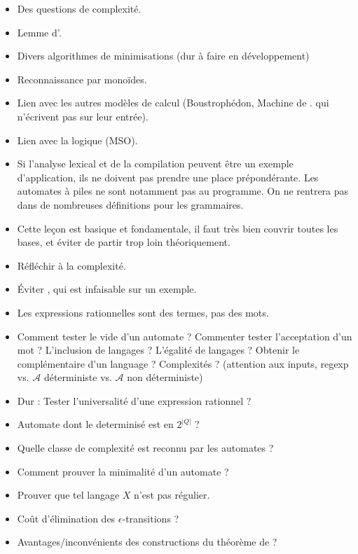 \documentclass{agregfiche}
\begin{document}
\secidees
\begin{itemize}
	\item Des questions de complexité.
    \item Lemme d'.
	\item Divers algorithmes de minimisations (dur à faire en développement)
	\item Reconnaissance par monoïdes.
	\item Lien avec les autres modèles de calcul (Boustrophédon, Machine de .
	qui n'écrivent pas sur leur entrée).
	\item Lien avec la logique (MSO).
\end{itemize}


\secpieges

\begin{itemize}
\item Si l'analyse lexical et de la compilation peuvent être un exemple d'application, ils ne doivent pas prendre une place prépondérante. Les automates à piles ne sont notamment pas au programme. On ne rentrera pas dans de nombreuses définitions pour les grammaires.
\item Cette leçon est basique et fondamentale, il faut très bien couvrir toutes les bases, et éviter de partir trop loin théoriquement.
\item Réfléchir à la complexité.
\item Éviter  , qui est infaisable sur un exemple.
\item Les expressions rationnelles sont des termes, pas des mots.
\end{itemize}




\secquestionsclassiques
\begin{itemize}
\item Comment tester le vide d'un automate ? Commenter tester l'acceptation d'un mot ? L'inclusion de langages ? L'égalité de langages ? Obtenir le complémentaire d'un language ? Complexités ? (attention aux inputs, regexp vs. $\mathcal{A}$ déterministe vs. $\mathcal{A}$ non déterministe)
\item Dur : Tester l'universalité d'une expression rationnel ?
\item Automate dont le determinisé est en $2^{|Q|}$ ?
\item Quelle classe de complexité est reconnu par les automates ?
\item Comment prouver la minimalité d'un automate ?
\item Prouver que tel langage $X$ n'est pas régulier.
\item Coût d'élimination des $\epsilon$-transitions ?
\item Avantages/inconvénients des constructions du théorème de   ?
\end{itemize}
\end{document}
